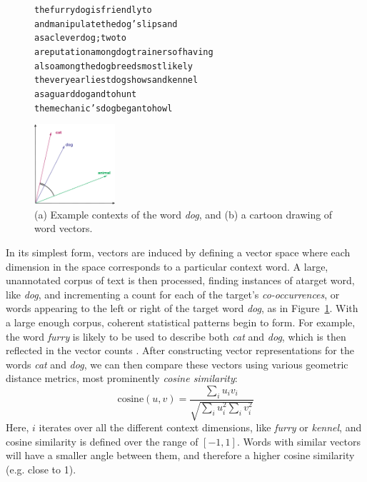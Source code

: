 \documentclass[12pt]{article}
\begin{document}
\begin{figure}
\centering
\begin{minipage}{7cm}
\begin{scriptsize}
\begin{alltt}
         the furry {dog} is friendly to
and manipulate the {dog} 's lips and
       as a clever {dog} ; two to
a reputation among {dog} trainers of having
    also among the {dog} breeds most likely
 the very earliest {dog} shows and kennel
        as a guard {dog} and to hunt
   the mechanic 's {dog} began to howl
\end{alltt}
\end{scriptsize}
\end{minipage}\qquad
\begin{minipage}{3cm}
\includegraphics[width=3cm]{figures/vsm}
\end{minipage}
\caption{(a) Example contexts of the word {\em dog}, and (b) a cartoon drawing
of word vectors.}
\label{fig:vsm}
\end{figure}

In its simplest form, vectors are induced by defining a vector space where
each dimension in the space corresponds to a particular context word. A large,
unannotated corpus of text is then processed, finding instances of atarget word,
like {\em dog}, and incrementing a count for each of the target's {\em
co-occurrences}, or words appearing to the left or right of the target word
{\em dog}, as in Figure~\ref{fig:vsm}. With a large enough corpus, coherent
statistical patterns begin to form. For example, the word {\em furry} is likely
to be used to describe both {\em cat} and {\em dog}, which is then reflected in
the vector counts \cite{lund:1996:brmic}. After constructing vector
representations for the words {\em cat} and {\em dog}, we can then compare
these vectors using various geometric distance metrics, most prominently {\em
cosine similarity}:
\begin{equation}
  \text{cosine}(u, v) = \frac{\sum_i u_iv_i}{\sqrt{\sum_i u_i^2 \sum_i v_i^2}}
  \label{eq:cos}
\end{equation}
Here, $i$ iterates over all the different context dimensions, like {\em furry}
or {\em kennel}, and cosine similarity is defined over the range of $[-1, 1]$.
Words with similar vectors will have a smaller angle between them, and therefore
a higher cosine similarity (e.g. close to 1).
\end{document}
